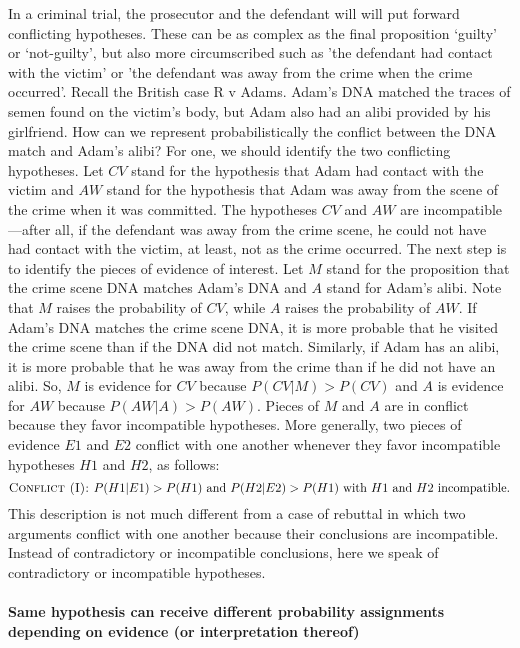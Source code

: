 \documentclass[10pt]{article}
\begin{document}
In a criminal trial, the prosecutor and the defendant will will put forward conflicting hypotheses. These can be as complex as the final proposition `guilty' or `not-guilty', but also more circumscribed such as 'the defendant had contact with the victim' or 'the defendant was away from the crime when the crime occurred'. Recall the British case R v Adams. Adam's DNA matched the traces of semen found on the victim's body, but Adam also had an alibi provided by his girlfriend. How can we represent probabilistically the conflict between the DNA match and Adam's alibi?  For one, we should identify the two conflicting hypotheses. Let $CV$ stand for the hypothesis that Adam had contact with the victim and $AW$ stand for the hypothesis that Adam was away from the scene of the crime when it was committed. The hypotheses $CV$ and $AW$ are incompatible---after all, if the defendant was away from the crime scene, he could not have had contact with the victim, at least, not as the crime occurred. The next step is to identify the pieces of evidence of interest. Let $M$ stand for the proposition that the crime scene DNA matches Adam's DNA and $A$ stand for Adam's alibi. Note that $M$ raises the probability of $CV$, while $A$ raises the probability of $AW$. If Adam's DNA matches the crime scene DNA, it is more probable that he visited the crime scene than if the DNA did not match. Similarly, if Adam has an alibi, 
it is more probable that he was away from the crime than if he did not have an alibi. So, $M$ is evidence for $CV$ because $P(CV|M)> P(CV)$ and 
$A$ is evidence for $AW$ because $P(AW|A)> P(AW)$. Pieces of $M$ and $A$ are in conflict because they favor incompatible hypotheses. 
More generally, two pieces of evidence $E1$ and $E2$ conflict with one another whenever they 
favor incompatible hypotheses $H1$ and $H2$, as follows:
%
\[\textsc{Conflict (I): } P(H1| E1)>P(H1) \text{ and } P(H2|E2)>P(H1) \text{ with  $H1$ and $H2$ incompatible.}\]
%
This description is not much different from a case of rebuttal in which two arguments conflict with one another 
because their conclusions are incompatible. Instead of contradictory or incompatible conclusions, here 
we speak of contradictory or incompatible hypotheses. 

\paragraph{Same hypothesis can receive different probability assignments depending on evidence (or interpretation thereof)}
\end{document}
